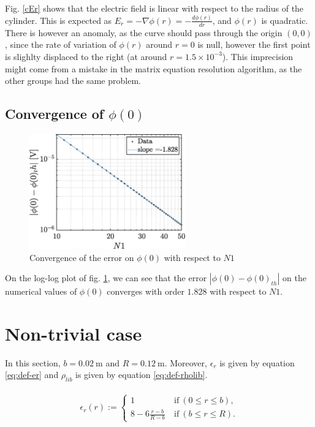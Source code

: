 \documentclass[a4paper,12pt,twoside]{article}
\newcommand{\grad}[1]{\nabla#1}
\newcommand{\bracket}[1]{\left(#1\right)}
\begin{document}
  Fig. \ref{cEr} shows that the electric field is linear with respect to the radius of the cylinder. This is expected as $E_r = -\grad{\phi(r)} = -\frac{d\phi(r)}{dr}$, and $\phi(r)$ is quadratic. There is however an anomaly, as the curve should pass through the origin $(0,0)$, since the rate of variation of $\phi(r)$ around $r=0$ is null, however the first point is slighlty displaced to the right (at around $r=1.5\times 10^{-3}$). This imprecision might come from a mistake in the matrix equation resolution algorithm, as the other groups had the same problem.

  \subsection{Convergence of $\phi(0)$}

  \begin{figure}[h]
   \centering
   \includegraphics[width=0.6\textwidth]{graphs/c_convphi.eps}
   \caption{Convergence of the error on $\phi(0)$ with respect to $N1$}
   \label{cconv}
  \end{figure}

  On the log-log plot of fig. \ref{cconv}, we can see that the error $|\phi(0)-\phi(0)_{th}|$ on the numerical values of $\phi(0)$ converges with order $1.828$ with respect to $N1$.

  \section{Non-trivial case}
  In this section, $b=\SI{0.02}{\m}$ and $R=\SI{0.12}{\m}$. Moreover, $\epsilon_r$ is given by equation \eqref{eq:def-er} and $\rho_{lib}$ is given by equation \eqref{eq:def-rholib}.

  \begin{align}
    \begin{split}
      \epsilon_r\bracket{r} := \begin{cases}
        1~&\text{if}~\bracket{0\leq r\leq b},\\
        8-6\frac{r-b}{R-b}~&\text{if}~\bracket{b\leq r\leq R}.
      \end{cases}
    \end{split}
    \label{eq:def-er}
  \end{align}
\end{document}
